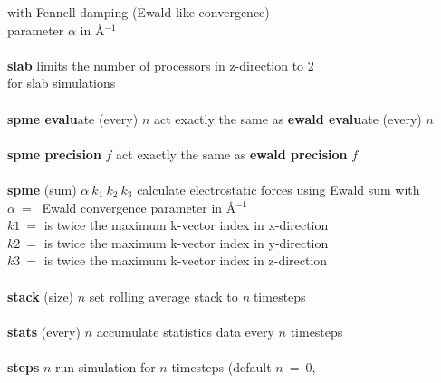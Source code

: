 \begin{tabbing}
\>                                              \> with Fennell \cite{fennell-06a} damping (Ewald-like convergence) \\
\>                                              \> parameter $\alpha$ in \AA$^{-1}$ \\
\>                                              \> \\
\> {\bf slab}                                   \> limits the number of processors in z-direction to 2 \\
\>                                              \> for slab simulations \\
\>                                              \> \\
\> {\bf spme evalu}ate (every) $n$              \> act exactly the same as {\bf ewald evalu}ate (every) $n$ \\
\>                                              \> \\
\> {\bf spme precision} $f$                     \> act exactly the same as {\bf ewald precision} $f$ \\
\>                                              \> \\
\> {\bf spme} (sum) $\alpha~k_{1}~k_{2}~k_{3}$  \> calculate electrostatic forces using Ewald sum with \\
\>                                              \> $\alpha~=~$ Ewald convergence parameter in \AA$^{-1}$ \\
\>                                              \> $k1~=$ is twice the maximum k-vector index in x-direction \\
\>                                              \> $k2~=$ is twice the maximum k-vector index in y-direction \\
\>                                              \> $k3~=$ is twice the maximum k-vector index in z-direction \\
\>                                              \> \\
\> {\bf stack} (size) $n$                       \> set rolling average stack to {\em n} timesteps \\
\>                                              \> \\
\> {\bf stats} (every) $n$                      \> accumulate statistics data every $n$ timesteps \\
\>                                              \> \\
\> {\bf steps} $n$                              \> run simulation for $n$ timesteps (default $n~=~0$, \\

\end{tabbing}
